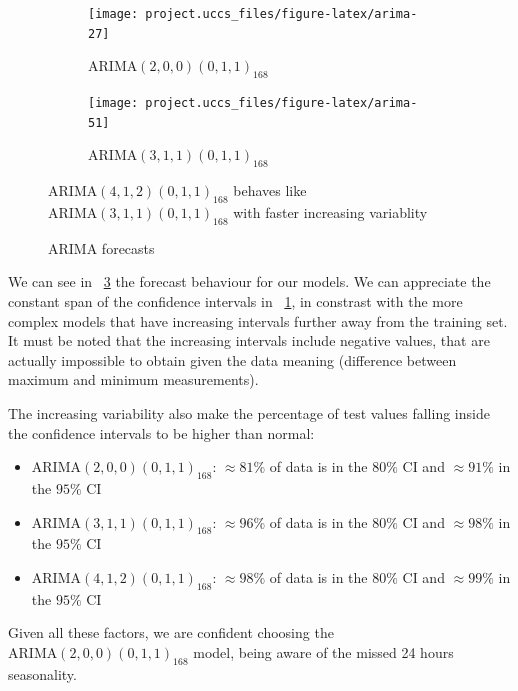 \documentclass[12pt]{article}
\begin{document}
\begin{figure}[h]
	\begin{subfigure}{.5\linewidth}
		\texttt{[image: project.uccs\_files/figure-latex/arima-27]} %
		\caption{$\mathrm{ARIMA}(2,0,0)(0,1,1)_{168}$}
		\label{fig:arima-forecast:200011}
	\end{subfigure}
	\begin{subfigure}{.5\linewidth}
		\texttt{[image: project.uccs\_files/figure-latex/arima-51]} %
		\caption{$\mathrm{ARIMA}(3,1,1)(0,1,1)_{168}$}
		\label{fig:arima-forecast:412011}
	\end{subfigure}
	\begin{center}
		\caption{ARIMA forecasts}{\footnotesize$\mathrm{ARIMA}(4,1,2)(0,1,1)_{168}$ behaves like $\mathrm{ARIMA}(3,1,1)(0,1,1)_{168}$ with faster increasing variablity}
		\label{fig:arima-forecast}
	\end{center}
\end{figure}

We can see in \figurename~\ref{fig:arima-forecast} the forecast behaviour for our models. We can appreciate the constant span of the confidence intervals in \figurename~\ref{fig:arima-forecast:200011}, in constrast with the more complex models that have increasing intervals further away from the training set. It must be noted that the increasing intervals include negative values, that are actually impossible to obtain given the data meaning (difference between maximum and minimum measurements).

The increasing variability also make the percentage of test values falling inside the confidence intervals to be higher than normal:
\begin{itemize}[topsep=0.5em,itemsep=0em,partopsep=0.5em]
	\item $\mathrm{ARIMA}(2,0,0)(0,1,1)_{168}$: $\approx81\%$ of data is in the $80\%$ CI and $\approx91\%$ in the $95\%$ CI
	\item $\mathrm{ARIMA}(3,1,1)(0,1,1)_{168}$: $\approx96\%$ of data is in the $80\%$ CI and $\approx98\%$ in the $95\%$ CI
	\item $\mathrm{ARIMA}(4,1,2)(0,1,1)_{168}$: $\approx98\%$ of data is in the $80\%$ CI and $\approx99\%$ in the $95\%$ CI
\end{itemize}

Given all these factors, we are confident choosing the $\mathrm{ARIMA}(2,0,0)(0,1,1)_{168}$ model, being aware of the missed 24 hours seasonality.

\end{document}
